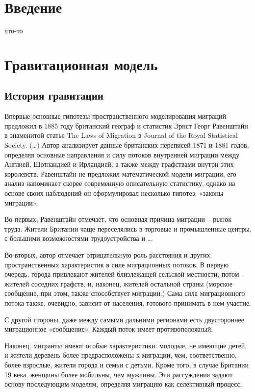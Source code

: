 \documentclass[a4paper,12pt]{article}
\begin{document}
	


\tableofcontents

\clearpage
\section{Введение}

что-то


\clearpage
\section{Гравитационная модель}

\subsection{История гравитации}

Впервые основные гипотезы пространственного моделирования миграций предложил в 1885 году британский географ и статистик Эрнст Георг Равенштайн в знаменитой статье The Laws of Migration в Journal of the Royal Statistical Society. (…) Автор анализирует данные британских переписей 1871 и 1881 годов, определяя основные направления и силу потоков внутренней миграции между Англией, Шотландией и Ирландией, а также между графствами внутри этих королевств. Равенштайн не предложил математической модели миграции, его анализ напоминает скорее современную описательную статистику, однако на основе своих наблюдений он сформулировал несколько гипотез, «законы миграции». 

Во-первых, Равенштайн отмечает, что основная причина миграции – рынок труда. Жители Британии чаще переселялись в торговые и промышленные центры, с большими возможностями трудоустройства и …

Во-вторых, автор отмечает отрицательную роль расстояния и других пространственных характеристик в силе миграционных потоков. В первую очередь, города привлекают жителей близлежащей сельской местности, потом – жителей соседних графств, и, наконец, жителей остальной страны (морское сообщение, при этом, также способствует миграции.) Сама сила миграционного потока также, очевидно, зависит от населения, готового принимать в нем участие.

С другой стороны, даже между самыми дальними регионами есть двустороннее миграционное «сообщение». Каждый поток имеет противоположный.

Наконец, мигранты имеют особые характеристики: молодые, не имеющие детей, и жители деревень более предрасположены к миграции, чем, соответственно, более взрослые, жители города и семьи с детьми. Кроме того, в случае Британии 19 века, женщины более мобильны, чем мужчины. Эти рассуждения задают основу последующим моделям, определяя миграцию как селективный процесс.
\end{document}
